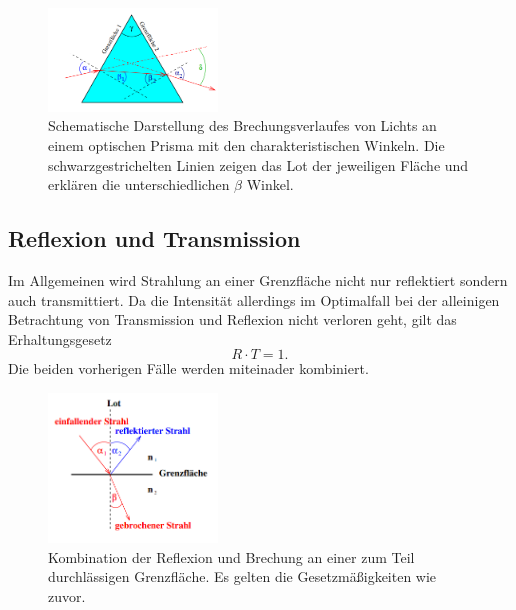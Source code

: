 \begin{figure}
    \centering
    \includegraphics[width=0.4\textwidth]{bilder/5.png}
    \caption{Schematische Darstellung des Brechungsverlaufes von Lichts an einem optischen Prisma mit den charakteristischen Winkeln. Die schwarzgestrichelten Linien zeigen das Lot der jeweiligen Fläche und erklären die unterschiedlichen $\beta$ Winkel. \cite{skript}}
    \label{fig:prisma}
\end{figure}

\newpage

\subsection{Reflexion und Transmission}
Im Allgemeinen wird Strahlung an einer Grenzfläche nicht nur reflektiert sondern auch transmittiert. Da die Intensität allerdings im Optimalfall bei der alleinigen Betrachtung von Transmission und Reflexion nicht verloren geht, gilt das Erhaltungsgesetz
\begin{equation*}
R \cdot T = 1.
\end{equation*}
Die beiden vorherigen Fälle werden miteinader kombiniert.
\begin{figure}
    \centering
    \includegraphics[width=0.4\textwidth]{bilder/3.png}
    \caption{Kombination der Reflexion und Brechung an einer zum Teil durchlässigen Grenzfläche. Es gelten die Gesetzmäßigkeiten wie zuvor. \cite{skript}}
    \label{fig:combo}
\end{figure}

